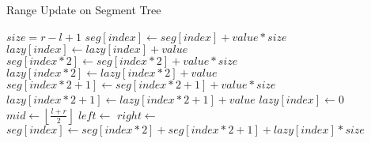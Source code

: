 \begin{algorithm}
    \caption{Range Update on Segment Tree }
    \begin{algorithmic}
         
            \State $size = r - l + 1$
                \State \Return
                \State $seg[index] \gets {seg[index] + value*size}$
                \State $lazy[index] \gets {lazy[index] + value}$
                \State \Return
            \Else
                \State $seg[index*2] \gets {seg[index*2] + value*size}$ 
                \State $lazy[index*2] \gets {lazy[index*2] + value}$ 
                \State $seg[index*2+1] \gets {seg[index*2+1] + value*size}$ 
                \State $lazy[index*2+1] \gets {lazy[index*2+1] + value}$ 
                \State $lazy[index] \gets {0}$ 
                \State $mid \gets \left\lfloor \frac{l + r}{2} \right\rfloor$
                \State $left \gets$ 
                \State $right \gets$ 
                \State $seg[index] \gets {seg[index*2] + seg[index*2+1] + lazy[index]*size}$ 
            \EndIf
        \EndProcedure
    \end{algorithmic}
\end{algorithm}